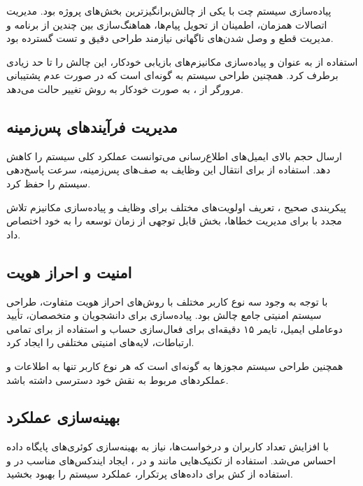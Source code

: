 \documentclass[12pt,a4paper]{report}
\begin{document}
	پیاده‌سازی سیستم چت  با  یکی از چالش‌برانگیزترین بخش‌های پروژه بود. مدیریت اتصالات همزمان، اطمینان از تحویل پیام‌ها، هماهنگ‌سازی بین چندین  از برنامه و مدیریت قطع و وصل شدن‌های ناگهانی نیازمند طراحی دقیق و تست گسترده بود.
	
	استفاده از  به عنوان  و پیاده‌سازی مکانیزم‌های بازیابی خودکار، این چالش را تا حد زیادی برطرف کرد. همچنین طراحی سیستم به گونه‌ای است که در صورت عدم پشتیبانی مرورگر از ، به صورت خودکار به روش  تغییر حالت می‌دهد.
	
	\subsection{مدیریت فرآیندهای پس‌زمینه}
	
	ارسال حجم بالای ایمیل‌های اطلاع‌رسانی می‌توانست عملکرد کلی سیستم را کاهش دهد. استفاده از  برای انتقال این وظایف به صف‌های پس‌زمینه، سرعت پاسخ‌دهی سیستم را حفظ کرد.
	
	پیکربندی صحیح ، تعریف اولویت‌های مختلف برای وظایف و پیاده‌سازی مکانیزم تلاش مجدد با  برای مدیریت خطاها، بخش قابل توجهی از زمان توسعه را به خود اختصاص داد.
	
	\subsection{امنیت و احراز هویت}
	
	با توجه به وجود سه نوع کاربر مختلف با روش‌های احراز هویت متفاوت، طراحی سیستم امنیتی جامع چالش بود. پیاده‌سازی  برای دانشجویان و متخصصان، تأیید دوعاملی ایمیل، تایمر ۱۵ دقیقه‌ای برای فعال‌سازی حساب و استفاده از  برای تمامی ارتباطات، لایه‌های امنیتی مختلفی را ایجاد کرد.
	
	همچنین طراحی سیستم مجوزها به گونه‌ای است که هر نوع کاربر تنها به اطلاعات و عملکردهای مربوط به نقش خود دسترسی داشته باشد.
	
	\subsection{بهینه‌سازی عملکرد}
	
	با افزایش تعداد کاربران و درخواست‌ها، نیاز به بهینه‌سازی کوئری‌های پایگاه داده احساس می‌شد. استفاده از تکنیک‌هایی مانند  و  در ، ایجاد ایندکس‌های مناسب در  و استفاده از کش  برای داده‌های پرتکرار، عملکرد سیستم را بهبود بخشید.
	
\end{document}
